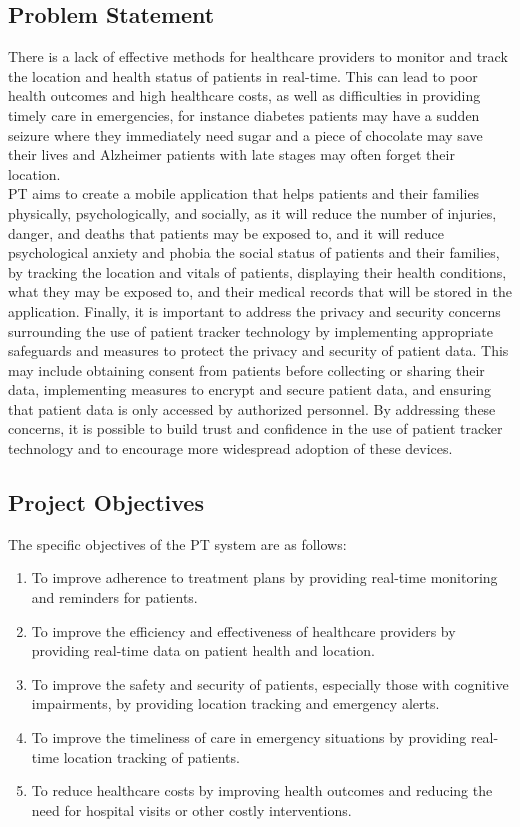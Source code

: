 \documentclass[12pt]{article}
\begin{document}
		\subsection{Problem Statement}
			
			\quad There is a lack of effective methods for healthcare providers to monitor and track the location and health status of patients in real-time. This can lead to poor health outcomes and high healthcare costs, as well as difficulties in providing timely care in emergencies, for instance diabetes patients may have a sudden seizure where they immediately need sugar and a piece of chocolate may save their lives and Alzheimer patients with late stages may often forget their location.\\
			
			PT aims to create a mobile application that helps patients and their families physically, psychologically, and socially, as it will reduce the number of injuries, danger, and deaths that patients may be exposed to, and it will reduce psychological anxiety and phobia the social status of patients and their families, by tracking the location and vitals of patients, displaying their health conditions, what they may be exposed to, and their medical records that will be stored in the application. Finally, it is important to address the privacy and security concerns surrounding the use of patient tracker technology by implementing appropriate safeguards and measures to protect the privacy and security of patient data. This may include obtaining consent from patients before collecting or sharing their data, implementing measures to encrypt and secure patient data, and ensuring that patient data is only accessed by authorized personnel. By addressing these concerns, it is possible to build trust and confidence in the use of patient tracker technology and to encourage more widespread adoption of these devices.
			
		\subsection{Project Objectives}
		The specific objectives of the PT system are as follows:
		\begin{enumerate}
			\item To improve adherence to treatment plans by providing real-time monitoring and reminders for patients.
			\item To improve the efficiency and effectiveness of healthcare providers by providing real-time data on patient health and location.
			\item To improve the safety and security of patients, especially those with cognitive impairments, by providing location tracking and emergency alerts.
			\item To improve the timeliness of care in emergency situations by providing real-time location tracking of patients.
			\item To reduce healthcare costs by improving health outcomes and reducing the need for hospital visits or other costly interventions.
		
		\end{enumerate}
\end{document}
